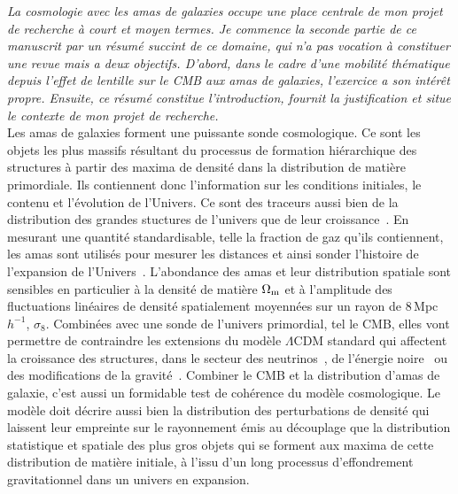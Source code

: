 
%
%
%
%
%                 
%
%
%

\emph{La cosmologie avec les amas de galaxies occupe une place centrale de
mon projet de recherche à court et moyen termes. Je commence la
seconde partie de ce manuscrit par un résumé succint de ce domaine,
qui n'a pas vocation à constituer une revue mais a deux
objectifs. D'abord, dans le cadre d'une mobilité thématique depuis
l'effet de lentille sur le CMB aux amas de galaxies, l'exercice a son
intérêt propre. Ensuite, ce résumé constitue l'introduction, fournit
la justification et situe le contexte de mon projet de recherche.}\\


Les amas de galaxies forment une puissante sonde cosmologique.
Ce sont les objets les plus massifs résultant du processus de formation
hiérarchique des structures à partir des maxima de
densité dans la distribution de matière primordiale. Ils contiennent
donc l'information sur les conditions initiales, le contenu et
l'évolution de l'Univers. Ce sont des traceurs aussi bien de la
distribution des grandes stuctures de l'univers que de leur
croissance~\citep[pour une revue]{Allen2011}. En mesurant une quantité
standardisable, telle la fraction de gaz qu'ils contiennent, les amas
sont utilisés pour mesurer les distances et ainsi sonder
l'histoire de l'expansion de l'Univers~\citep{Sasaki1996, Ettori2009}.  
L'abondance des amas et leur distribution spatiale sont sensibles en
particulier à la densité de matière $\Omega_{\rm{m}}$ et à l'amplitude
des fluctuations linéaires de densité spatialement moyennées sur un
rayon de 8\,Mpc\,$h^{-1}$, $\sigma_8$. Combinées
avec une sonde de l'univers primordial, tel le CMB, elles vont
permettre de contraindre les extensions du modèle
$\Lambda$CDM standard qui affectent la croissance des structures, dans
le secteur des neutrinos~\citep{Wang2005, Bolliet2019}, de l'énergie
noire~\citep{Haiman2001} ou des modifications de la
gravité~\citep{Mohr2003, Hagstotz2019}. Combiner le CMB et
la distribution d'amas de galaxie,
c'est aussi un formidable test de cohérence du modèle cosmologique.%
Le modèle doit décrire aussi bien la distribution des perturbations de
densité qui laissent leur empreinte sur le rayonnement émis au
découplage que la distribution statistique et spatiale des plus gros
objets qui se forment aux maxima de cette distribution de matière
initiale, à l'issu d'un long processus d'effondrement gravitationnel
dans un univers en expansion. 

